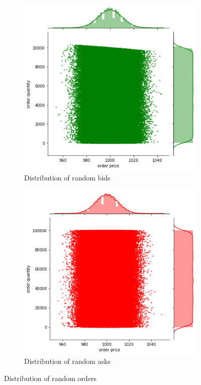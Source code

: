 \begin{figure}
    \centering
    \begin{subfigure}{.5\textwidth}
      \centering
      \includegraphics[width=\linewidth]{plots/order_distr_bid.png}
      \caption{Distribution of random bids}
      \label{fig:gener_bids}
    \end{subfigure}%
    \begin{subfigure}{.5\textwidth}
      \centering
      \includegraphics[width=\linewidth]{plots/order_distr_ask.png}
      \caption{Distribution of random asks}
      \label{fig:gener_asks}
    \end{subfigure}
    \caption{Distribution of random orders}
    \label{fig:generated_orders}
\end{figure}




